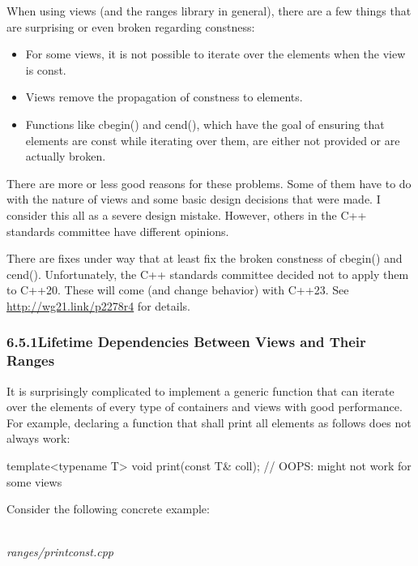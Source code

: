 
When using views (and the ranges library in general), there are a few things that are surprising or even broken regarding constness:

\begin{itemize}
\item
For some views, it is not possible to iterate over the elements when the view is const.

\item
Views remove the propagation of constness to elements.

\item
Functions like cbegin() and cend(), which have the goal of ensuring that elements are const while iterating over them, are either not provided or are actually broken.
\end{itemize}

There are more or less good reasons for these problems. Some of them have to do with the nature of views and some basic design decisions that were made. I consider this all as a severe design mistake. However, others in the C++ standards committee have different opinions.

There are fixes under way that at least fix the broken constness of cbegin() and cend(). Unfortunately, the C++ standards committee decided not to apply them to C++20. These will come (and change behavior) with C++23. See \url{http://wg21.link/p2278r4} for details.

\subsubsection*{ 6.5.1\hspace{0.2cm}Lifetime Dependencies Between Views and Their Ranges}

It is surprisingly complicated to implement a generic function that can iterate over the elements of every type of containers and views with good performance. For example, declaring a function that shall print all elements as follows does not always work:

\begin{cpp}
template<typename T>
void print(const T& coll); // OOPS: might not work for some views
\end{cpp}

Consider the following concrete example:

\noindent
\hspace*{\fill} \\ %
\textit{ranges/printconst.cpp}

